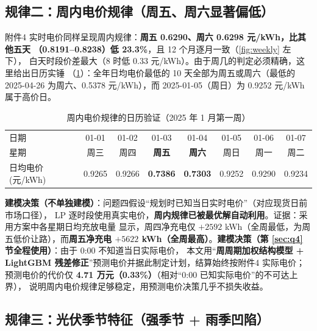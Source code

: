 \documentclass[12pt,a4paper,fontset=fandol]{ctexart}
\begin{document}
\subsection{规律二\nobreak：周内电价规律（周五\nobreak、周六显著偏低\nobreak）}

附件4 实时电价同样呈现周内规律\nobreak：\textbf{周五 0.6290\nobreak、周六 0.6298 元/kWh\nobreak，比其他五天
（0.8191--0.8238\nobreak）低 23.3\%}\nobreak，且 12 个月逐月一致（\cref{fig:weekly} 左下\nobreak）\nobreak，
白天时段价差最大（8 时低 0.33 元/kWh\nobreak）\nobreak。由于周几的判定必须精确\nobreak，这里给出日历实锤
（\cref{tab:calendar}\nobreak）\nobreak：全年日均电价最低的 10 天全部为周五或周六（最低的
2025-04-26 为周六\nobreak、0.5378 元/kWh\nobreak）\nobreak，而 2025-01-05（周日\nobreak）为 0.9252 元/kWh 属于高价日\nobreak。

\begin{table}[htbp]
\centering
\caption{周内电价规律的日历验证（2025 年 1 月第一周\nobreak）}
\label{tab:calendar}
\begin{tabular}{@{}lccccccc@{}}
\toprule
日期 & 01-01 & 01-02 & 01-03 & 01-04 & 01-05 & 01-06 & 01-07 \\
星期 & 周三 & 周四 & \textbf{周五} & \textbf{周六} & 周日 & 周一 & 周二 \\
日均电价(元/kWh) & 0.9265 & 0.9266 & \textbf{0.7386} & \textbf{0.7303} & 0.9252 & 0.9290 & 0.9234 \\
\bottomrule
\end{tabular}
\end{table}

\textbf{建模决策（不单独建模\nobreak）}\nobreak：问题四假设“规划时已知当日实时电价\nobreak”（对应现货日前市场口径\nobreak）\nobreak，
LP 逐时段使用真实电价\nobreak，\textbf{周内规律已被最优解自动利用}\nobreak。证据\nobreak：采用方案中各星期日均充放电量
显示\nobreak，周四净充电仅 $+2592$ kWh（全周最低\nobreak，为周五低价让路\nobreak）\nobreak，而\textbf{周五净充电
$+5622$ kWh（全周最高\nobreak）}\nobreak。\textbf{建模决策（第 \ref{sec:q4} 节全程使用）}\nobreak：由于 0:00 不知道当日实际电价\nobreak，
本文用“\textbf{周周期加权结构模型 + LightGBM 残差修正\nobreak}”预测电价并据此制定计划\nobreak，结算始终按附件4 实际电价\nobreak；
预测电价的代价仅 \textbf{4.71 万元（0.33\%\nobreak）}（相对“0:00 已知实际电价\nobreak”的不可达上界）\nobreak，
说明周内电价规律足够稳定\nobreak，用预测电价决策几乎不损失收益\nobreak。

\subsection{规律三\nobreak：光伏季节特征（强季节 + 雨季凹陷\nobreak）}
\end{document}
